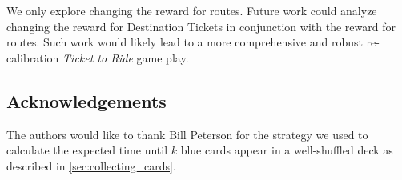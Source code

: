 We only explore changing the reward for routes.
Future work could analyze changing the reward for
Destination Tickets in conjunction with the
reward for routes.
Such work would likely lead to a more
comprehensive and robust re-calibration
\textit{Ticket to Ride} game play.

\subsection{Acknowledgements}
The authors would like to thank Bill Peterson for
the strategy we used to calculate the expected time
until $k$ blue cards appear in a well-shuffled deck
as described in \cref{sec:collecting_cards}.
